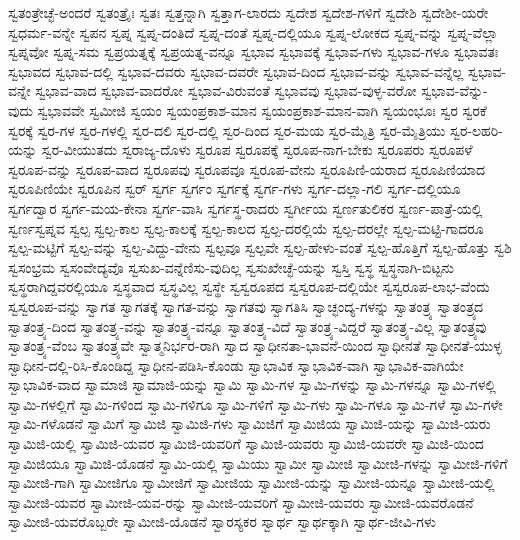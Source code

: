 {ಸ್ವತಂತ್ರೇಚ್ಛೆ-ಅಂದರೆ
ಸ್ವತಂತ್ರೈಃ
ಸ್ವತಃ
ಸ್ವತ್ತನ್ನಾಗಿ
ಸ್ವತ್ತಾಗ-ಲಾರದು
ಸ್ವದೇಶ
ಸ್ವದೇಶ-ಗಳಿಗೆ
ಸ್ವದೇಶಿ
ಸ್ವದೇಶೀ-ಯರೇ
ಸ್ವಧರ್ಮ-ವನ್ನೇ
ಸ್ವಪನ
ಸ್ವಪ್ನ
ಸ್ವಪ್ನ-ದಂತಿದೆ
ಸ್ವಪ್ನ-ದಂತೆ
ಸ್ವಪ್ನ-ದಲ್ಲಿಯೂ
ಸ್ವಪ್ನ-ಲೋಕದ
ಸ್ವಪ್ನ-ವನ್ನು
ಸ್ವಪ್ನ-ವೆಲ್ಲಾ
ಸ್ವಪ್ನವೋ
ಸ್ವಪ್ನ-ಸಮ
ಸ್ವಪ್ರಯತ್ನಕ್ಕೆ
ಸ್ವಪ್ರಯತ್ನ-ವನ್ನೂ
ಸ್ವಭಾವ
ಸ್ವಭಾವಕ್ಕೆ
ಸ್ವಭಾವ-ಗಳು
ಸ್ವಭಾವ-ಗಳೂ
ಸ್ವಭಾವತಃ
ಸ್ವಭಾವದ
ಸ್ವಭಾವ-ದಲ್ಲಿ
ಸ್ವಭಾವ-ದವರು
ಸ್ವಭಾವ-ದವರೇ
ಸ್ವಭಾವ-ದಿಂದ
ಸ್ವಭಾವ-ವನ್ನು
ಸ್ವಭಾವ-ವನ್ನೆಲ್ಲ
ಸ್ವಭಾವ-ವನ್ನೇ
ಸ್ವಭಾವ-ವಾದ
ಸ್ವಭಾವ-ವಾದರೋ
ಸ್ವಭಾವ-ವಿರುವಂತೆ
ಸ್ವಭಾವವು
ಸ್ವಭಾವ-ವುಳ್ಳ-ವರೋ
ಸ್ವಭಾವ-ವೆನ್ನು-ವುದು
ಸ್ವಭಾವವೇ
ಸ್ವಮೀಜಿ
ಸ್ವಯಂ
ಸ್ವಯಂಪ್ರಕಾಶ-ಮಾನ
ಸ್ವಯಂಪ್ರಕಾಶ-ಮಾನ-ವಾಗಿ
ಸ್ವಯಂಭೂಃ
ಸ್ವರ
ಸ್ವರಕೆ
ಸ್ವರಕ್ಕೆ
ಸ್ವರ-ಗಳ
ಸ್ವರ-ಗಳಲ್ಲಿ
ಸ್ವರ-ದಲಿ
ಸ್ವರ-ದಲ್ಲಿ
ಸ್ವರ-ದಿಂದ
ಸ್ವರ-ಮಯ
ಸ್ವರ-ಮೈತ್ರಿ
ಸ್ವರ-ಮೈತ್ರಿಯು
ಸ್ವರ-ಲಹರಿ-ಯನ್ನು
ಸ್ವರ-ವೀಯುತದು
ಸ್ವರಾಜ್ಯ-ದೊಳು
ಸ್ವರೂಪ
ಸ್ವರೂಪಕ್ಕೆ
ಸ್ವರೂಪ-ನಾಗ-ಬೇಕು
ಸ್ವರೂಪರು
ಸ್ವರೂಪಳೆ
ಸ್ವರೂಪ-ವನ್ನು
ಸ್ವರೂಪ-ವಾದ
ಸ್ವರೂಪವು
ಸ್ವರೂಪವೂ
ಸ್ವರೂಪ-ವೇನು
ಸ್ವರೂಪಿಣಿ-ಯರಾದ
ಸ್ವರೂಪಿಣಿಯಾದ
ಸ್ವರೂಪಿಣಿಯೇ
ಸ್ವರೂಪಿನ
ಸ್ವರ್
ಸ್ವರ್ಗ
ಸ್ವರ್ಗಂ
ಸ್ವರ್ಗಕ್ಕೆ
ಸ್ವರ್ಗ-ಗಳು
ಸ್ವರ್ಗ-ದಲ್ಲಾ-ಗಲಿ
ಸ್ವರ್ಗ-ದಲ್ಲಿಯೂ
ಸ್ವರ್ಗದ್ವಾರ
ಸ್ವರ್ಗ-ಮಯ-ಕೇನಾ
ಸ್ವರ್ಗ-ವಾಸಿ
ಸ್ವರ್ಗಸ್ಥ-ರಾದರು
ಸ್ವರ್ಗೀಯ
ಸ್ವರ್ಣತುಲಿಕರ
ಸ್ವರ್ಣ-ಪಾತ್ರೆ-ಯಲ್ಲಿ
ಸ್ವರ್ಣಸ್ವಪ್ನವ
ಸ್ವಲ್ಪ
ಸ್ವಲ್ಪ-ಕಾಲ
ಸ್ವಲ್ಪ-ಕಾಲಕ್ಕೆ
ಸ್ವಲ್ಪ-ಕಾಲದ
ಸ್ವಲ್ಪ-ದರಲ್ಲಿಯೆ
ಸ್ವಲ್ಪ-ದರಲ್ಲೇ
ಸ್ವಲ್ಪ-ಮಟ್ಟಿ-ಗಾದರೂ
ಸ್ವಲ್ಪ-ಮಟ್ಟಿಗೆ
ಸ್ವಲ್ಪ-ವನ್ನು
ಸ್ವಲ್ಪ-ವಿದ್ದು-ವೇನು
ಸ್ವಲ್ಪವೂ
ಸ್ವಲ್ಪವೇ
ಸ್ವಲ್ಪ-ಹೇಳು-ವಂತೆ
ಸ್ವಲ್ಪ-ಹೊತ್ತಿಗೆ
ಸ್ವಲ್ಪ-ಹೊತ್ತು
ಸ್ವಶಿ
ಸ್ವಸಂಭ್ರಮ
ಸ್ವಸಂವೇದ್ಯವೊ
ಸ್ವಸುಖ-ವನ್ನೆಣಿಸು-ವುದಿಲ್ಲ
ಸ್ವಸುಖೇಚ್ಛೆ-ಯನ್ನು
ಸ್ವಸ್ತಿ
ಸ್ವಸ್ಥ
ಸ್ವಸ್ಥನಾಗಿ-ಬಿಟ್ಟನು
ಸ್ವಸ್ಥರಾಗಿದ್ದವರಲ್ಲಿಯೂ
ಸ್ವಸ್ಥವಾದ
ಸ್ವಸ್ಥವಿಲ್ಲ
ಸ್ವಸ್ಥೇ
ಸ್ವಸ್ವರೂಪದ
ಸ್ವಸ್ವರೂಪ-ದಲ್ಲಿಯೇ
ಸ್ವಸ್ವರೂಪ-ಲಾಭ-ವೆಂದು
ಸ್ವಸ್ವರೂಪ-ವನ್ನು
ಸ್ವಾಗತ
ಸ್ವಾಗತಕ್ಕೆ
ಸ್ವಾಗತ-ವನ್ನು
ಸ್ವಾಗತವು
ಸ್ವಾಗತಿಸಿ
ಸ್ವಾಚ್ಛಂದ್ಯ-ಗಳನ್ನು
ಸ್ವಾತಂತ್ರ್ಯ
ಸ್ವಾತಂತ್ರ್ಯದ
ಸ್ವಾತಂತ್ರ್ಯ-ದಿಂದ
ಸ್ವಾತಂತ್ರ್ಯ-ವನ್ನು
ಸ್ವಾತಂತ್ರ್ಯ-ವನ್ನೂ
ಸ್ವಾತಂತ್ರ್ಯ-ವಿದೆ
ಸ್ವಾತಂತ್ರ್ಯ-ವಿದ್ದರೆ
ಸ್ವಾತಂತ್ರ್ಯ-ವಿಲ್ಲ
ಸ್ವಾತಂತ್ರ್ಯವು
ಸ್ವಾತಂತ್ರ್ಯ-ವೆಂಬ
ಸ್ವಾತಂತ್ರ್ಯವೇ
ಸ್ವಾತ್ಮನಿರ್ಭರ-ರಾಗಿ
ಸ್ವಾದ
ಸ್ವಾಧೀನತಾ-ಭಾವನೆ-ಯಿಂದ
ಸ್ವಾಧೀನತೆ
ಸ್ವಾಧೀನತೆ-ಯುಳ್ಳ
ಸ್ವಾಧೀನ-ದಲ್ಲಿ-ರಿಸಿ-ಕೊಂಡಿದ್ದ
ಸ್ವಾಧೀನ-ಪಡಿಸಿ-ಕೊಂಡು
ಸ್ವಾಭಾವಿಕ
ಸ್ವಾಭಾವಿಕ-ವಾಗಿ
ಸ್ವಾಭಾವಿಕ-ವಾಗಿಯೇ
ಸ್ವಾಭಾವಿಕ-ವಾದ
ಸ್ವಾಮಾಜಿ
ಸ್ವಾಮಾಜಿ-ಯನ್ನು
ಸ್ವಾಮಿ
ಸ್ವಾಮಿ-ಗಳ
ಸ್ವಾಮಿ-ಗಳನ್ನು
ಸ್ವಾಮಿ-ಗಳನ್ನೂ
ಸ್ವಾಮಿ-ಗಳಲ್ಲಿ
ಸ್ವಾಮಿ-ಗಳಲ್ಲಿಗೆ
ಸ್ವಾಮಿ-ಗಳಿಂದ
ಸ್ವಾಮಿ-ಗಳಿಗೂ
ಸ್ವಾಮಿ-ಗಳಿಗೆ
ಸ್ವಾಮಿ-ಗಳು
ಸ್ವಾಮಿ-ಗಳೂ
ಸ್ವಾಮಿ-ಗಳೆ
ಸ್ವಾಮಿ-ಗಳೇ
ಸ್ವಾಮಿ-ಗಳೊಡನೆ
ಸ್ವಾಮಿಗೆ
ಸ್ವಾಮಿಜಿ
ಸ್ವಾಮಿಜಿ-ಗಳು
ಸ್ವಾಮಿಜಿಗೆ
ಸ್ವಾಮಿಜಿಯ
ಸ್ವಾಮಿಜಿ-ಯನ್ನು
ಸ್ವಾಮಿಜಿ-ಯರು
ಸ್ವಾಮಿಜಿ-ಯಲ್ಲಿ
ಸ್ವಾಮಿಜಿ-ಯವರ
ಸ್ವಾಮಿಜಿ-ಯವರಿಗೆ
ಸ್ವಾಮಿಜಿ-ಯವರು
ಸ್ವಾಮಿಜಿ-ಯವರೇ
ಸ್ವಾಮಿಜಿ-ಯಿಂದ
ಸ್ವಾಮಿಜಿಯೂ
ಸ್ವಾಮಿಜಿ-ಯೊಡನೆ
ಸ್ವಾಮಿ-ಯಲ್ಲಿ
ಸ್ವಾಮಿಯು
ಸ್ವಾಮೀ
ಸ್ವಾಮೀಜಿ
ಸ್ವಾಮೀಜಿ-ಗಳನ್ನು
ಸ್ವಾಮೀಜಿ-ಗಳಿಗೆ
ಸ್ವಾಮೀಜಿ-ಗಾಗಿ
ಸ್ವಾಮೀಜಿಗೂ
ಸ್ವಾಮೀಜಿಗೆ
ಸ್ವಾಮೀಜಿಯ
ಸ್ವಾಮೀಜಿ-ಯನ್ನು
ಸ್ವಾಮೀಜಿ-ಯನ್ನೂ
ಸ್ವಾಮೀಜಿ-ಯಲ್ಲಿ
ಸ್ವಾಮೀಜಿ-ಯವರ
ಸ್ವಾಮೀಜಿ-ಯವ-ರನ್ನು
ಸ್ವಾಮೀಜಿ-ಯವರಿಗೆ
ಸ್ವಾಮೀಜಿ-ಯವರು
ಸ್ವಾಮೀಜಿ-ಯವರೊಡನೆ
ಸ್ವಾಮೀಜಿ-ಯವರೊಬ್ಬರೇ
ಸ್ವಾಮೀಜಿ-ಯೊಡನೆ
ಸ್ವಾರಸ್ಯಕರ
ಸ್ವಾರ್ಥ
ಸ್ವಾರ್ಥಕ್ಕಾಗಿ
ಸ್ವಾರ್ಥ-ಜೀವಿ-ಗಳು
}
